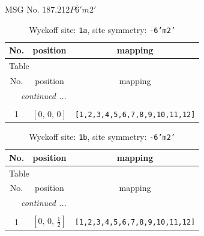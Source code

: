 \documentclass[fleqn,8pt]{jsarticle}
\begin{document}
\setcounter{MaxMatrixCols}{32}

\renewcommand{\tablename}{Table~}
\renewcommand{\figurename}{Figure~}
\begin{center}
\LARGE
MSG No. 187.212\quad$P\bar{6}'m2'$
\end{center}
\renewcommand{\arraystretch}{1.2}
\begin{longtable}{ccc}
\caption{Wyckoff site: {\tt 1a}, site symmetry: {\tt -6'm2'}}
 \\
 \hline \hline
No. & position & mapping \\ \hline \endfirsthead

\multicolumn{2}{l}{\tablename\ \thetable{}} \\
 \hline \hline
No. & position & mapping \\ \hline \endhead

 \hline \hline
\multicolumn{2}{r}{\footnotesize\it continued ...} \\ \endfoot

 \hline \hline
\multicolumn{2}{r}{} \\ \endlastfoot

1 & $\left[ 0,\, 0,\, 0 \right]$ & {\tt [1,2,3,4,5,6,7,8,9,10,11,12]} \\
\end{longtable}
\renewcommand{\arraystretch}{1.2}
\begin{longtable}{ccc}
\caption{Wyckoff site: {\tt 1b}, site symmetry: {\tt -6'm2'}}
 \\
 \hline \hline
No. & position & mapping \\ \hline \endfirsthead

\multicolumn{2}{l}{\tablename\ \thetable{}} \\
 \hline \hline
No. & position & mapping \\ \hline \endhead

 \hline \hline
\multicolumn{2}{r}{\footnotesize\it continued ...} \\ \endfoot

 \hline \hline
\multicolumn{2}{r}{} \\ \endlastfoot

1 & $\left[ 0,\, 0,\, \frac{1}{2} \right]$ & {\tt [1,2,3,4,5,6,7,8,9,10,11,12]} \\
\end{longtable}
\renewcommand{\arraystretch}{1.2}
\end{document}
